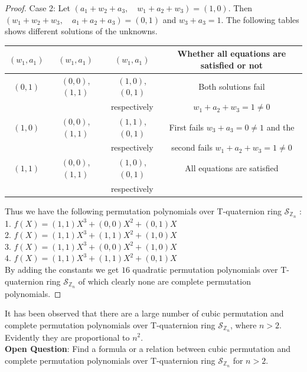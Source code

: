 \documentclass[sn-mathphys,Numbered]{sn-jnl}%
\theoremstyle{thmstyleone}
\theoremstyle{thmstyletwo}
\theoremstyle{thmstylethree}
\begin{document}
\begin{proof}
\vspace{0.5cm}
\noindent
Case 2: Let $(a_{1}+w_{2}+a_{3}, \quad w_{1}+a_{2}+w_{3})=(1,0)$. Then $(w_{1}+w_{2}+w_{3}, \quad a_{1}+a_{2}+a_{3})=(0,1)$ and $w_{3}+a_{3}=1$. The following tables shows different solutions of the unknowns.
\begin{tabular}{|c|c|c|c|}
  \hline
 $(w_{1},a_{1})$ & $(w_{1},a_{1})$ & $(w_{1},a_{1})$ & Whether all equations are satisfied or not \\ \hline
  $(0,1)$ & $(0,0)$,$(1,1)$ & $(1,0)$,$(0,1)$  & Both solutions fail \\
 & & respectively& $w_{1}+a_{2}+w_{3}=1\neq 0$ \\ \hline
  $(1,0)$ &$(0,0)$,$(1,1)$ & $(1,1)$,$(0,1)$  &  First fails $w_{3}+a_{3}=0\neq 1$ and the \\ 
  & &respectively & second fails $w_{1}+a_{2}+w_{3}=1\neq 0$\\ \hline
 $(1,1)$ & $(0,0)$,$(1,1)$ & $(1,0)$,$(0,1)$  & All equations are satisfied \\
 & & respectively &  \\  \hline
\end{tabular}
\vspace{0.5cm}


\noindent
Thus we have the following permutation polynomials over T-quaternion ring $\mathcal{S}_{\mathbb{Z}_{n}}$ : \\
1. $f(X)=(1,1)X^{3}+(0,0)X^{2}+(0,1)X$  \\
2. $f(X)=(1,1)X^{3}+(1,1)X^{2}+(1,0)X$ \\
3. $f(X)=(1,1)X^{3}+(0,0)X^{2}+(1,0)X$  \\
4. $f(X)=(1,1)X^{3}+(1,1)X^{2}+(0,1)X$ \\
By adding the constants we get $16$ quadratic permutation polynomials over T-quaternion ring $\mathcal{S}_{\mathbb{Z}_{n}}$ of which clearly none are complete permutation polynomials. 
\end{proof}
\noindent
It has been observed that there are a large number of cubic permutation and complete permutation polynomials  over T-quaternion ring $\mathcal{S}_{\mathbb{Z}_{n}}$, where $n>2$. Evidently they are proportional to $n^{2}$. \\
\textbf{Open Question}: Find a formula or a relation between cubic permutation  and complete permutation polynomials  over T-quaternion ring $\mathcal{S}_{\mathbb{Z}_{n}}$ for $n>2$. 
\end{document}

